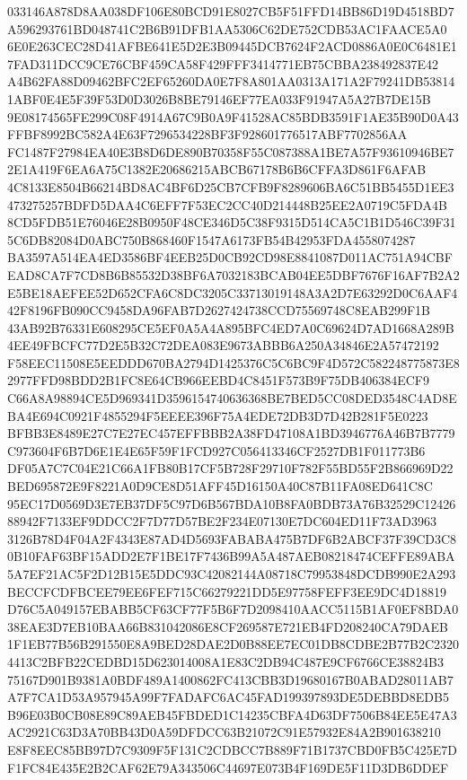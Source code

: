 \documentclass[UTF8,fontset=fandol,zihao=-4,a4paper]{ctexart}
\begin{document}
{{033146A878D8AA038DF106E80BCD91E8027CB5F51FFD14BB86D19D4518BD7A596293761BD048741C2B6B91DFB1AA5306C62DE752CDB53AC1FAACE5A0
6E0E263CEC28D41AFBE641E5D2E3B09445DCB7624F2ACD0886A0E0C6481E17FAD311DCC9CE76CBF459CA58F429FFF3414771EB75CBBA238492837E42
A4B62FA88D09462BFC2EF65260DA0E7F8A801AA0313A171A2F79241DB538141ABF0E4E5F39F53D0D3026B8BE79146EF77EA033F91947A5A27B7DE15B
9E08174565FE299C08F4914A67C9B0A9F41528AC85BDB3591F1AE35B90D0A43FFBF8992BC582A4E63F7296534228BF3F928601776517ABF7702856AA
FC1487F27984EA40E3B8D6DE890B70358F55C087388A1BE7A57F93610946BE72E1A419F6EA6A75C1382E20686215ABCB67178B6B6CFFA3D861F6AFAB
4C8133E8504B66214BD8AC4BF6D25CB7CFB9F8289606BA6C51BB5455D1EE3473275257BDFD5DAA4C6EFF7F53EC2CC40D214448B25EE2A0719C5FDA4B
8CD5FDB51E76046E28B0950F48CE346D5C38F9315D514CA5C1B1D546C39F315C6DB82084D0ABC750B868460F1547A6173FB54B42953FDA4558074287
BA3597A514EA4ED3586BF4EEB25D0CB92CD98E8841087D011AC751A94CBFEAD8CA7F7CD8B6B85532D38BF6A7032183BCAB04EE5DBF7676F16AF7B2A2
E5BE18AEFEE52D652CFA6C8DC3205C33713019148A3A2D7E63292D0C6AAF442F8196FB090CC9458DA96FAB7D2627424738CCD75569748C8EAB299F1B
43AB92B76331E608295CE5EF0A5A4A895BFC4ED7A0C69624D7AD1668A289B4EE49FBCFC77D2E5B32C72DEA083E9673ABBB6A250A34846E2A57472192
F58EEC11508E5EEDDD670BA2794D1425376C5C6BC9F4D572C582248775873E82977FFD98BDD2B1FC8E64CB966EEBD4C8451F573B9F75DB406384ECF9
C66A8A98894CE5D969341D3596154740636368BE7BED5CC08DED3548C4AD8EBA4E694C0921F4855294F5EEEE396F75A4EDE72DB3D7D42B281F5E0223
BFBB3E8489E27C7E27EC457EFFBBB2A38FD47108A1BD3946776A46B7B7779C973604F6B7D6E1E4E65F59F1FCD927C056413346CF2527DB1F011773B6
DF05A7C7C04E21C66A1FB80B17CF5B728F29710F782F55BD55F2B866969D22BED695872E9F8221A0D9CE8D51AFF45D16150A40C87B11FA08ED641C8C
95EC17D0569D3E7EB37DF5C97D6B567BDA10B8FA0BDB73A76B32529C1242688942F7133EF9DDCC2F7D77D57BE2F234E07130E7DC604ED11F73AD3963
3126B78D4F04A2F4343E87AD4D5693FABABA475B7DF6B2ABCF37F39CD3C80B10FAF63BF15ADD2E7F1BE17F7436B99A5A487AEB08218474CEFFE89ABA
5A7EF21AC5F2D12B15E5DDC93C42082144A08718C79953848DCDB990E2A293BECCFCDFBCEE79EE6FEF715C66279221DD5E97758FEFF3EE9DC4D18819
D76C5A049157EBABB5CF63CF77F5B6F7D2098410AACC5115B1AF0EF8BDA038EAE3D7EB10BAA66B831042086E8CF269587E721EB4FD208240CA79DAEB
1F1EB77B56B291550E8A9BED28DAE2D0B88EE7EC01DB8CDBE2B77B2C23204413C2BFB22CEDBD15D623014008A1E83C2DB94C487E9CF6766CE38824B3
75167D901B9381A0BDF489A1400862FC413CBB3D19680167B0ABAD28011AB7A7F7CA1D53A957945A99F7FADAFC6AC45FAD199397893DE5DEBBD8EDB5
B96E03B0CB08E89C89AEB45FBDED1C14235CBFA4D63DF7506B84EE5E47A3AC2921C63D3A70BB43D0A59DFDCC63B21072C91E57932E84A2B901638210
E8F8EEC85BB97D7C9309F5F131C2CDBCC7B889F71B1737CBD0FB5C425E7DF1FC84E435E2B2CAF62E79A343506C44697E073B4F169DE5F11D3DB6DDEF
}}
\end{document}
